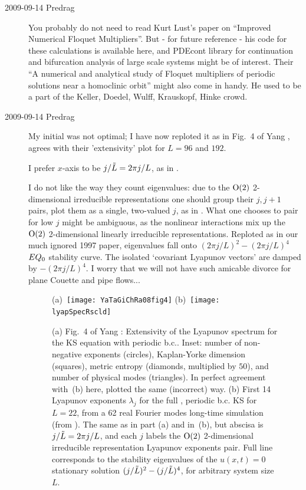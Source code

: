 \begin{description}
\item[2009-09-14 Predrag] You probably do not need to read
     {Kurt Lust}'s paper on ``Improved Numerical Floquet
Multipliers''. But - for future reference - his
     code for these calculations is
     {available here}, and
     {PDEcont library}  for continuation and bifurcation analysis
      of large scale systems might be of interest.
Their ``A numerical and analytical study of Floquet
        multipliers of periodic solutions near
        a homoclinic orbit''
might also come in handy.
He used to be a part of the Keller, Doedel, Wulff, Krauskopf,
Hinke crowd.

\item[2009-09-14 Predrag]
My initial  was not optimal; I have now
reploted it as in Fig.~4 of
Yang \etal{},
agrees with their 'extensivity' plot for $L=96$ and $192$.

I prefer $x$-axis to be $j/\tilde{L} = 2 \pi j/L$, as in
.

I do not like the way they count eigenvalues:  due to the $\textrm{O}(2)$
2-dimensional irreducible representations
one should group their $j,j+1$ pairs,
plot them as a single, two-valued $j$, as in
. What one chooses to pair for low
$j$ might be ambiguous, as the nonlinear interactions mix up
the $\textrm{O}(2)$ 2-dimensional linearly irreducible representations.
Reploted as in our much ignored 1997 paper,
eigenvalues fall onto $ (2 \pi j/L)^2 - (2 \pi j/L)^4 $
\eqv\ $EQ_{0}$  stability curve.
The isolated `covariant Lyapunov vectors'
are damped by $-(2 \pi j/L)^4$. I worry that we will not have such
amicable divorce for plane Couette and pipe flows...

\begin{figure}
 (a)~\texttt{[image: YaTaGiChRa08fig4]}
 (b)~\texttt{[image: lyapSpecRscld]}
\caption{
(a)
Fig.~4 of
Yang \etal{}:
Extensivity of the Lyapunov spectrum for the KS equation with
periodic b.c.. Inset: number of non-negative exponents (circles),
Kaplan-Yorke dimension (squares), metric entropy (diamonds,
multiplied by $50$), and number of physical modes (triangles).
In perfect agreement with
\,(b) here, plotted the same
(incorrect) way.
(b)
First 14 Lyapunov exponents $\lambda_j$ for the full
\statesp, periodic b.c. KS for $L=22$, from a 62 real Fourier
modes long-time simulation (from ).
The same as in part (a) and in \,(b), but
abscisa is $j/\tilde{L} = 2 \pi j/L$, and each $j$ labels
the $\textrm{O}(2)$ 2-dimensional irreducible representation
Lyapunov exponents pair.  Full line corresponds to
the stability eigenvalues
of the $u(x,t)=0$ stationary solution
$(j/\tilde{L})^2- (j/\tilde{L})^4$, for arbitrary system size $L$.
}
\label{fig:lyapSpecRscld}
\end{figure}




\end{description}
